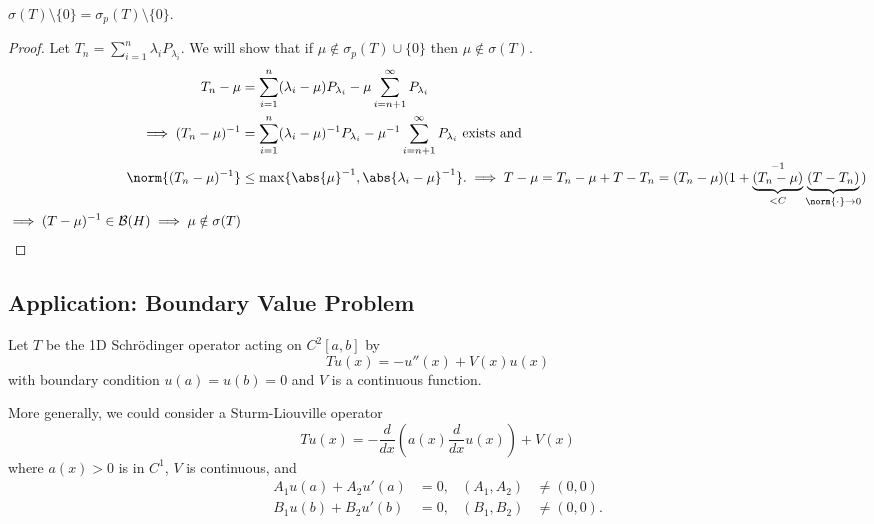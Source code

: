 \documentclass{article}
\begin{document}
\begin{cor}
    $\sigma(T) \setminus \{0\} = \sigma_p(T) \setminus \{0\}$.
\end{cor}

\begin{proof}
    Let $T_n = \sum_{i=1}^n \lambda_i P_{\lambda_i}$. We will show that if $\mu \notin \sigma_p(T) \cup \{0\}$ then $\mu \notin \sigma(T)$.
    \begin{align*}
        T_n - \mu &= \sum_{i=1}^n (\lambda_i - \mu) P_{\lambda_i} - \mu \sum_{i=n+1}^\infty P_{\lambda_i} \\
        \implies (T_n - \mu)^{-1} &= \sum_{i=1}^n (\lambda_i - \mu)^{-1} P_{\lambda_i} - \mu^{-1} \sum_{i=n+1}^\infty P_{\lambda_i} \text{ exists and} \\
        \norm{(T_n - \mu)^{-1}} &\leq \max\{\abs{\mu}^{-1}, \abs{\lambda_i-\mu}^{-1}\}.
        \implies T - \mu = T_n - \mu + T - T_n = (T_n - \mu)(1 + \underbrace{(T_n - \mu)}_{<C}^{-1}\underbrace{(T-T_n)}_{\norm{\cdot} \to 0}) \\
        \implies (T-\mu)^{-1} \in \mathcal{B}(H) \implies \mu \notin \sigma(T)
    \end{align*}
\end{proof}

\subsection{Application: Boundary Value Problem}
Let $T$ be the 1D Schr\"odinger operator acting on $C^2[a,b]$ by
\begin{equation*}
    Tu(x) = -u''(x) + V(x) u(x)
\end{equation*}
with boundary condition $u(a) = u(b) = 0$ and $V$ is a continuous function.

More generally, we could consider a Sturm-Liouville operator
\[Tu(x) = -\frac{d}{dx}\left(a(x) \frac{d}{dx} u(x)\right) + V(x)\]
where $a(x)>0$ is in $C^1$, $V$ is continuous, and
\begin{align*}
    A_1 u(a) + A_2 u'(a) &= 0, & (A_1, A_2) &\neq (0,0) \\
    B_1 u(b) + B_2 u'(b) &= 0, & (B_1, B_2) &\neq (0,0).
\end{align*}
\end{document}
